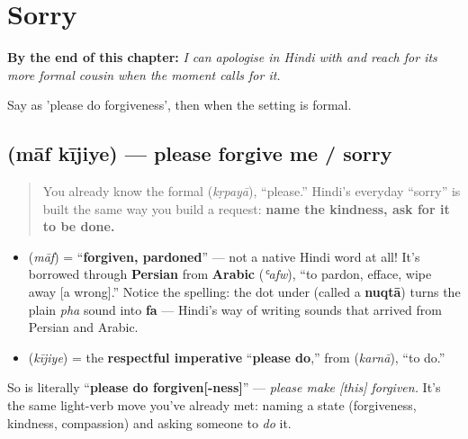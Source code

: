 
\chapter{Sorry}
\label{ch:hi-sorry}

\begin{chapteropening}
\textbf{By the end of this chapter:} \emph{I can apologise in Hindi with   and reach for its more formal cousin when the moment calls for it.}

Say   as 'please do forgiveness', then   when the setting is formal.
\end{chapteropening}

\section[\texorpdfstring{\hi{माफ़} \hi{कीजिए} / \hi{क्षमा} \hi{करें} (māf kījiye)}{माफ़ कीजिए / क्षमा करें (māf kījiye)}]{  (māf kījiye) — please forgive me / sorry}

\label{lesson:HI-C09-maaf-kijiye}



\begin{quote}
You already know the formal \textbf{} (\emph{kṛpayā}), \textquotedblleft{}please.\textquotedblright{} Hindi's everyday \textquotedblleft{}sorry\textquotedblright{} is built the same way you build a request: \textbf{name the kindness, ask for it to be done.}
\end{quote}

\begin{cousinweb}
\begin{itemize}
\raggedright
  \item \textbf{} (\emph{māf}) = \textquotedblleft{}\textbf{forgiven, pardoned}\textquotedblright{} — not a native Hindi word at all! It's borrowed through \textbf{Persian} from \textbf{Arabic} \textbf{} (\emph{ʿafw}), \textquotedblleft{}to pardon, efface, wipe away {[}a wrong{]}.\textquotedblright{} Notice the spelling: the dot under  (called a \textbf{nuqtā}) turns the plain \emph{pha} sound into \textbf{fa} — Hindi's way of writing sounds that arrived from Persian and Arabic.
  \item \textbf{} (\emph{kījiye}) = the \textbf{respectful imperative} \textquotedblleft{}\textbf{please do},\textquotedblright{} from \textbf{} (\emph{karnā}), \textquotedblleft{}to do.\textquotedblright{}
\end{itemize}

So \textbf{ } is literally \textquotedblleft{}\textbf{please do forgiven{[}-ness{]}}\textquotedblright{} — \emph{please make {[}this{]} forgiven.} It's the same light-verb move you've already met: naming a state (forgiveness, kindness, compassion) and asking someone to \emph{do} it.
\end{cousinweb}

